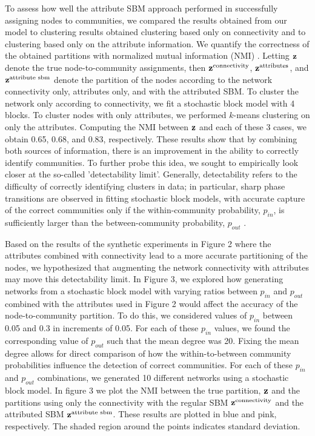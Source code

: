 \documentclass[journal]{IEEEtran}
\begin{document}
To assess how well the attribute SBM approach performed in successfully assigning nodes to communities, we compared the results obtained from our model to clustering results obtained clustering based only on connectivity and to clustering based only on the attribute information. We quantify the correctness of the obtained partitions with normalized mutual information (NMI) \cite{commdeccompare}. Letting ${\bf z}$ denote the true node-to-community assignments, then ${\bf z}^{\text{connectivity}}$, ${\bf z}^{\text{attributes}}$, and ${\bf z}^{\text{attribute sbm}}$ denote the partition of the nodes according to the network connectivity only, attributes only, and with the attributed SBM. To cluster the network only according to connectivity, we fit a stochastic block model with 4 blocks. To cluster nodes with only attributes, we performed $k$-means clustering on only the attributes. Computing the NMI between ${\bf z}$ and each of these 3 cases, we obtain 0.65, 0.68, and 0.83, respectively. 
These results show that by combining both sources of information, there is an improvement in the ability to correctly identify communities. To further probe this idea, we sought to empirically look closer at the so-called 'detectability limit'. Generally, detectability refers to the difficulty of correctly identifying clusters in data; in particular, sharp phase transitions are observed in fitting stochastic block models, with accurate capture of the correct communities only if the within-community probability, $p_{in}$, is sufficiently larger than the between-community probability, $p_{out}$ \cite{decelle,taylor}. 

Based on the results of the synthetic experiments in Figure 2 where the attributes combined with connectivity lead to a more accurate partitioning of the nodes, we hypothesized that augmenting the network connectivity with attributes may move this detectability limit. In Figure 3, we explored how generating networks from a stochastic block model with varying ratios between $p_{in}$ and $p_{out}$ combined with the attributes used in Figure 2 would affect the accuracy of the node-to-community partition. To do this, we considered values of $p_{in}$ between 0.05 and 0.3 in increments of 0.05. For each of these $p_{in}$ values, we found the corresponding value of $p_{out}$ such that the mean degree was 20. Fixing the mean degree allows for direct comparison of how the within-to-between community probabilities influence the detection of correct communities. For each of these $p_{in}$ and $p_{out}$ combinations, we generated 10 different networks using a stochastic block model. In figure 3 we plot the NMI between the true partition, ${\bf z}$ and the partitions using only the connectivity with the regular SBM ${\bf z}^{\text{connectivity}}$ and the attributed SBM ${\bf z}^{\text{attribute sbm}}$. These results are plotted in blue and pink, respectively. The shaded region around the points indicates standard deviation. 
\end{document}
